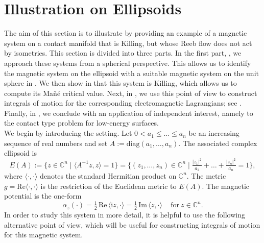 \documentclass[11pt,reqno]{amsart}
\newcommand{\IC}{{\mathbb C}}%
\newcommand{\CC}{\mathcal{C}}
\theoremstyle{plain}
\theoremstyle{definition}
\numberwithin{equation}{section}
\def\d{\delta}
\def\d{\delta}
\def\CC{{\mathbb C}}
\def\d{{\mathrm{d}}}
\def\i{{\mathrm{i}}}
\begin{document}

\section{Illustration on Ellipsoids}
\label{section: Illustration on Ellipsoids}

The aim of this section is to illustrate  by providing an example of a magnetic system on a contact manifold that is Killing, but whose Reeb flow does not act by isometries. This section is divided into three parts. In the first part, , we approach these systems from a spherical perspective. This allows us to identify the magnetic system on the ellipsoid with a suitable magnetic system on the unit sphere in . We then show in  that this system is Killing, which allows us to compute its Mañé critical value. Next, in , we use this point of view to construct integrals of motion for the corresponding electromagnetic Lagrangians; see . Finally, in , we conclude with an application of independent interest, namely to the contact type problem for low-energy surfaces.\\


We begin by introducing the setting. Let $0<a_1\leq \ldots \leq a_n$ be an increasing sequence of real numbers and set $A:=\mathrm{diag}(a_1,\ldots,a_n)$. The associated complex ellipsoid is
\begin{equation}\label{eq:defi_ellipsoid}
    E(A):=\Big\{z\in\IC^n \mid \langle A^{-1}z,z\rangle=1\Big\}
      =\Big\{(z_1,\ldots,z_n)\in\IC^n \mid \tfrac{|z_1|^2}{a_1}+\ldots+\tfrac{|z_n|^2}{a_n}=1\Big\},
\end{equation}
where $\langle\cdot,\cdot\rangle$ denotes the standard Hermitian product on $\IC^n$. The metric $g=\mathrm{Re}\langle\cdot,\cdot\rangle$ is the restriction of the Euclidean metric to $E(A)$. The magnetic potential is the one-form 
\[
\alpha_z(\cdot)=\tfrac12\,\mathrm{Re}\,\langle \i z,\cdot\rangle = \tfrac12\,\mathrm{Im}\,\langle z,\cdot\rangle \, \quad \text{for} \ z\in \CC^n.
\]
In order to study this system in more detail, it is helpful to use the following alternative point of view, which will be useful for constructing integrals of motion for this magnetic system. 
\end{document}
